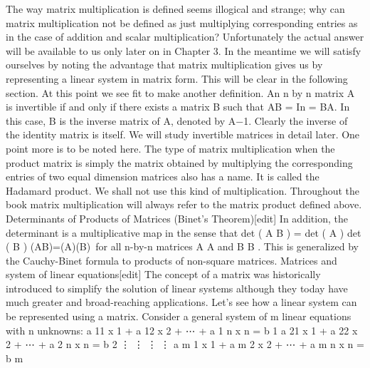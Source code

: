 The way matrix multiplication is defined seems illogical and strange; why can matrix multiplication not be defined as just multiplying corresponding entries as in the case of addition and scalar multiplication? Unfortunately the actual answer will be available to us only later on in Chapter 3. In the meantime we will satisfy ourselves by noting the advantage that matrix multiplication gives us by representing a linear system in matrix form. This will be clear in the following section. 
At this point we see fit to make another definition. An n by n matrix A is invertible if and only if there exists a matrix B such that 
AB = In = BA.
In this case, B is the inverse matrix of A, denoted by A−1. Clearly the inverse of the identity matrix is itself. We will study invertible matrices in detail later. 
One point more is to be noted here. The type of matrix multiplication when the product matrix is simply the matrix obtained by multiplying the corresponding entries of two equal dimension matrices also has a name. It is called the Hadamard product. We shall not use this kind of multiplication. Throughout the book matrix multiplication will always refer to the matrix product defined above. 
Determinants of Products of Matrices (Binet's Theorem)[edit]
In addition, the determinant is a multiplicative map in the sense that 
det ( A B ) = det ( A ) det ( B ) {\displaystyle \det(AB)=\det(A)\det(B)\,} 
 for all n-by-n matrices 
A {\displaystyle A} 
 and 
B {\displaystyle B} 
.
This is generalized by the Cauchy-Binet formula to products of non-square matrices. 
Matrices and system of linear equations[edit]
The concept of a matrix was historically introduced to simplify the solution of linear systems although they today have much greater and broad-reaching applications. Let's see how a linear system can be represented using a matrix. 
Consider a general system of m linear equations with n unknowns: 
a 11 x 1 + a 12 x 2 + ⋯ + a 1 n x n = b 1 a 21 x 1 + a 22 x 2 + ⋯ + a 2 n x n = b 2 ⋮ ⋮ ⋮ ⋮ a m 1 x 1 + a m 2 x 2 + ⋯ + a m n x n = b m {} 

